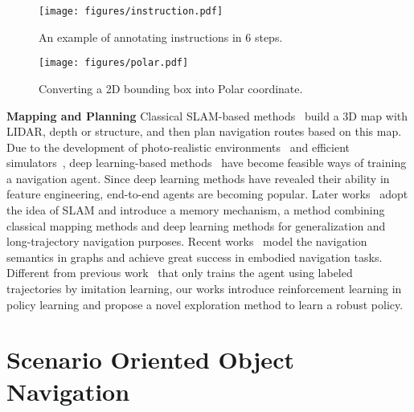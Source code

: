 \documentclass[final]{cvpr}
\begin{document}
\begin{figure*}[!t]
    \begin{minipage}{0.7\linewidth}
        \centering
        \texttt{[image: figures/instruction.pdf]}
        \vspace{-15pt}
        \caption{An example of annotating instructions in 6 steps.}
        \label{fig:instruction}
    \end{minipage} 
    \hfill
    \begin{minipage}{0.27\linewidth}
        \centering
        \texttt{[image: figures/polar.pdf]}
        \caption{Converting a 2D bounding box into Polar coordinate. }
        \label{fig:ploar}
    \end{minipage}\vspace{-10pt}
\end{figure*}

\noindent\textbf{Mapping and Planning} Classical SLAM-based methods~\cite{thrun2005probabilistic, davison1998mobile, gupta2020cognitive, fang2019scene, henriques2018mapnet, avraham2019empnet} build a 3D map with LIDAR, depth or structure, and then plan navigation routes based on this map. Due to the development of photo-realistic environments~\cite{anderson2018vision, chen2019touchdown, xia2018gibson} and efficient simulators~\cite{dosovitskiy2017carla, savva2017minos, savva2019habitat}, deep learning-based methods~\cite{mnih2015human, levine2016end, zhu2017target} have become feasible ways of training a navigation agent. 
Since deep learning methods have revealed their ability in feature engineering, end-to-end agents are becoming popular. 
Later works~\cite{fang2019scene, zhang2017neural, mezghani2020learning} adopt the idea of SLAM and introduce a memory mechanism, a method combining classical mapping methods and deep learning methods for generalization and long-trajectory navigation purposes. 
Recent works~\cite{chaplot2020learning, deng2020evolving, chaplot2020object} model the navigation semantics in graphs and achieve great success in embodied navigation tasks. 
Different from previous work~\cite{deng2020evolving} that only trains the agent using labeled trajectories by imitation learning, our works introduce reinforcement learning in policy learning and propose a novel exploration method to learn a robust policy. 

\section{Scenario Oriented Object Navigation}
\end{document}
